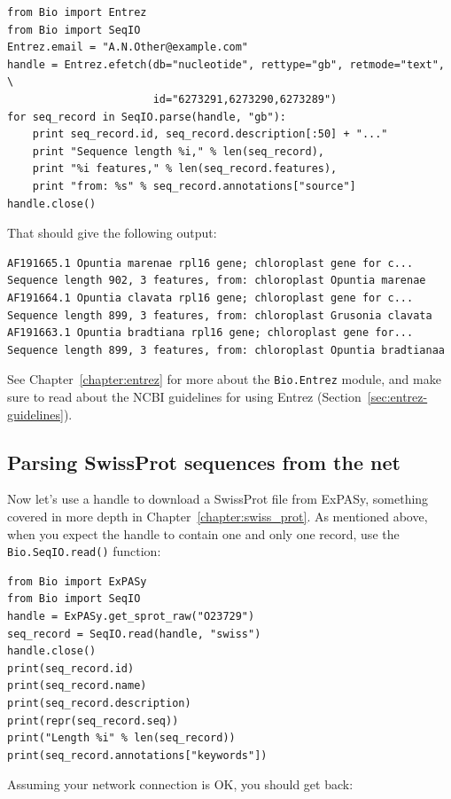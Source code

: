 \documentclass{report}
\begin{document}
\begin{verbatim}
from Bio import Entrez
from Bio import SeqIO
Entrez.email = "A.N.Other@example.com"
handle = Entrez.efetch(db="nucleotide", rettype="gb", retmode="text", \
                       id="6273291,6273290,6273289")
for seq_record in SeqIO.parse(handle, "gb"):
    print seq_record.id, seq_record.description[:50] + "..."
    print "Sequence length %i," % len(seq_record),
    print "%i features," % len(seq_record.features),
    print "from: %s" % seq_record.annotations["source"]
handle.close()
\end{verbatim}

\noindent That should give the following output:

\begin{verbatim}
AF191665.1 Opuntia marenae rpl16 gene; chloroplast gene for c...
Sequence length 902, 3 features, from: chloroplast Opuntia marenae
AF191664.1 Opuntia clavata rpl16 gene; chloroplast gene for c...
Sequence length 899, 3 features, from: chloroplast Grusonia clavata
AF191663.1 Opuntia bradtiana rpl16 gene; chloroplast gene for...
Sequence length 899, 3 features, from: chloroplast Opuntia bradtianaa
\end{verbatim}

See Chapter~\ref{chapter:entrez} for more about the \verb|Bio.Entrez| module, and make sure to read about the NCBI guidelines for using Entrez (Section~\ref{sec:entrez-guidelines}).

\subsection{Parsing SwissProt sequences from the net}
\label{sec:SeqIO_ExPASy_and_SwissProt}
Now let's use a handle to download a SwissProt file from ExPASy,
something covered in more depth in Chapter~\ref{chapter:swiss_prot}.
As mentioned above, when you expect the handle to contain one and only one record,
use the \verb|Bio.SeqIO.read()| function:

\begin{verbatim}
from Bio import ExPASy
from Bio import SeqIO
handle = ExPASy.get_sprot_raw("O23729")
seq_record = SeqIO.read(handle, "swiss")
handle.close()
print(seq_record.id)
print(seq_record.name)
print(seq_record.description)
print(repr(seq_record.seq))
print("Length %i" % len(seq_record))
print(seq_record.annotations["keywords"])
\end{verbatim}

\noindent Assuming your network connection is OK, you should get back:
\end{document}
